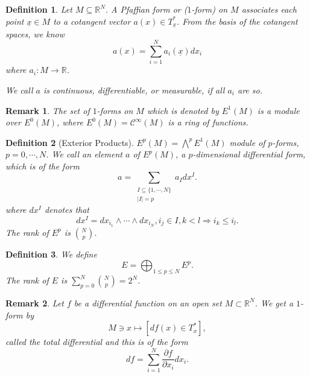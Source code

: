 \documentclass{article}
\newtheorem{definition}{Definition}[section]
\newtheorem{remark}{Remark}[section]
\newcommand{\R}[0]{\mathbb{R}}
\newcommand{\pd}[2]{{\frac {\partial#1} {\partial#2}}}
\newcommand{\ck}[1]{\mathcal{C}^{#1}}
\newcommand{\cinf}[0]{\ck{\infty}}
\begin{document}
\begin{definition}
  Let $M\subseteq\R^N$. A Pfaffian form or ($1$-form) on $M$ associates each point $\underline{x}\in M$ to a cotangent vector $a(x)\in T^*_{\underline{x}}$. 
  From the basis of the cotangent spaces, we know 
  \begin{equation*}
    a(x) = \sum_{i=1}^N a_i(\underline{x})dx_i
  \end{equation*}
  where $a_i:M\to\R$.
  \par We call $a$ is continuous, differentiable, or measurable, if all $a_i$ are so.
\end{definition}

\begin{remark}
The set of $1$-forms on $M$ which is denoted by $E^1(M)$ is a module over $E^0(M)$, where $E^0(M)=\cinf(M)$ is a ring of functions.
\end{remark}

\begin{definition}[Exterior Products]
  $E^p(M) = \bigwedge^p E^1(M)$ module of $p$-forms, $p=0,\cdots, N$. 
  We call an element $a$ of $E^p(M)$, a $p$-dimensional differential form, which is of the form
  \begin{equation*}
    a = \sum_{\substack{I\subseteq \{1,\cdots,N\}\\\vert I\vert = p}} a_Idx^{I}.
  \end{equation*}
  where $dx^I$ denotes that 
  \begin{equation*}
    dx^I = dx_{i_1}\wedge \cdots\wedge dx_{i_N}, i_j\in I, k<l\Rightarrow i_k\leq i_l.
  \end{equation*}
  The rank of $E^p$ is ${N \choose p}$.
\end{definition}

\begin{definition}
  We define
  \begin{equation*}
    E = \bigoplus_{1\leq p\leq N}E^p.
  \end{equation*}
  The rank of $E$ is $\sum_{p=0}^N{N\choose p} = 2^N$.
\end{definition}

\begin{remark}
  Let $f$ be a differential function on an open set $M\subset\R^N$. We get a $1$-form by 
  \begin{equation*}
    M\ni x\mapsto [df(x)\in T_x^*],
  \end{equation*}
  called the total differential and this is of the form 
  \begin{equation*}
    df = \sum_{i=1}^N \pd{f}{x_i}dx_i.
  \end{equation*}
\end{remark}
\end{document}
